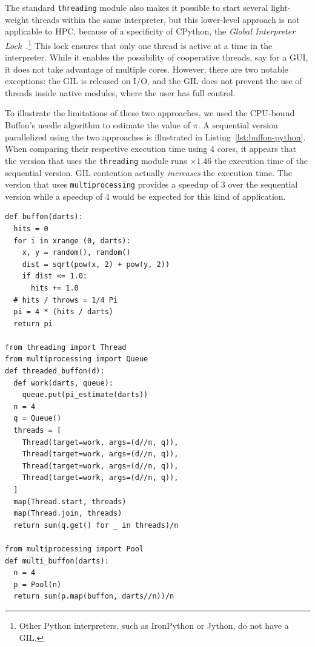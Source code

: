 \documentclass[conference]{IEEEtran}
\begin{document}
The standard \texttt{threading} module also makes it possible to start several
light-weight threads within the same interpreter, but this lower-level approach
is not applicable to HPC, because of a specificity of CPython, the \emph{Global
Interpreter Lock}~\cite{gil2012}.\footnote{Other Python interpreters, such as
IronPython or Jython, do not have a GIL.} This lock ensures that only one thread
is active at a time in the interpreter. While it enables the possibility of
cooperative threads, say for a GUI, it does not take advantage of multiple
cores. However, there are two notable exceptions: the GIL is released on I/O,
and the GIL does not prevent the use of threads inside native modules, where the
user has full control.

To illustrate the limitations of these two approaches, we used the CPU-bound
Buffon's needle algorithm to estimate the value of $\pi$. A sequential version
parallelized using the two approaches is illustrated in
Listing~\ref{lst:buffon-python}. When comparing their respective execution time
using 4 cores, it appears that the version that uses the \texttt{threading}
module runs $\times 1.46$ the execution time of the sequential version. GIL
contention actually \emph{increases} the execution time. The version that uses
\texttt{multiprocessing} provides a speedup of 3 over the sequential version
while a speedup of 4 would be expected for this kind of application.

\begin{lstlisting}[float, label={lst:buffon-python}, caption={Implementation of
sequential and parallel version of the Buffon algorithm in Python.}]
def buffon(darts):
  hits = 0
  for i in xrange (0, darts):
    x, y = random(), random()
    dist = sqrt(pow(x, 2) + pow(y, 2))
    if dist <= 1.0:
      hits += 1.0
  # hits / throws = 1/4 Pi
  pi = 4 * (hits / darts)
  return pi

from threading import Thread
from multiprocessing import Queue
def threaded_buffon(d):
  def work(darts, queue):
    queue.put(pi_estimate(darts))
  n = 4
  q = Queue()
  threads = [
    Thread(target=work, args=(d//n, q)),
    Thread(target=work, args=(d//n, q)),
    Thread(target=work, args=(d//n, q)),
    Thread(target=work, args=(d//n, q)),
  ]
  map(Thread.start, threads)
  map(Thread.join, threads)
  return sum(q.get() for _ in threads)/n

from multiprocessing import Pool
def multi_buffon(darts):
  n = 4
  p = Pool(n)
  return sum(p.map(buffon, darts//n))/n
\end{lstlisting}
\end{document}
